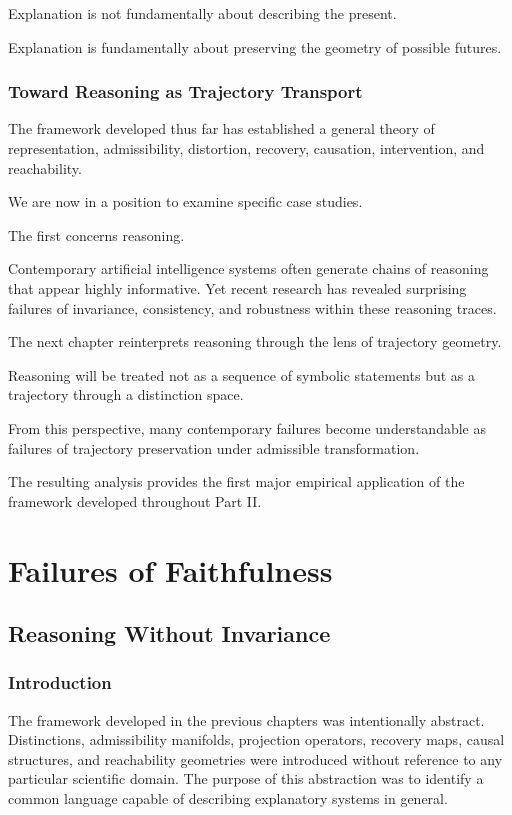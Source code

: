 \documentclass[11pt,oneside,openany]{book}
\begin{document}
Explanation is not fundamentally about describing the present.

Explanation is fundamentally about preserving the geometry of possible futures.

\section{Toward Reasoning as Trajectory Transport}

The framework developed thus far has established a general theory of representation, admissibility, distortion, recovery, causation, intervention, and reachability.

We are now in a position to examine specific case studies.

The first concerns reasoning.

Contemporary artificial intelligence systems often generate chains of reasoning that appear highly informative. Yet recent research has revealed surprising failures of invariance, consistency, and robustness within these reasoning traces.

The next chapter reinterprets reasoning through the lens of trajectory geometry.

Reasoning will be treated not as a sequence of symbolic statements but as a trajectory through a distinction space.

From this perspective, many contemporary failures become understandable as failures of trajectory preservation under admissible transformation.

The resulting analysis provides the first major empirical application of the framework developed throughout Part II.

\part{Failures of Faithfulness}

\chapter{Reasoning Without Invariance}

\section{Introduction}

The framework developed in the previous chapters was intentionally abstract. Distinctions, admissibility manifolds, projection operators, recovery maps, causal structures, and reachability geometries were introduced without reference to any particular scientific domain. The purpose of this abstraction was to identify a common language capable of describing explanatory systems in general.
\end{document}
